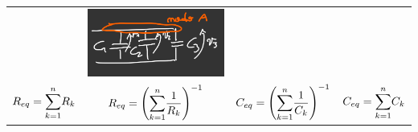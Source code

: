 \documentclass{article}
\begin{document}
\begin{center}
\begin{tabular}{c c c c}
        &
        \includegraphics[scale=0.37]{Image/Condensatori in parallelo.png}
        \\
        $R_{eq} = \mathlarger{\sum}_{k=1}^{n}R_k$
        &
        $R_{eq}= \left(\mathlarger{\sum}_{k=1}^n \dfrac{1}{R_k} \right)^{-1} $
        &
        $C_{eq} = \left( \mathlarger{\sum}_{k=1}^{n} \dfrac{1}{C_k} \right)^{-1}$
        &
        $C_{eq} = \mathlarger{\sum}_{k=1}^nC_k$
    \end{tabular}
\end{center}
\end{document}
